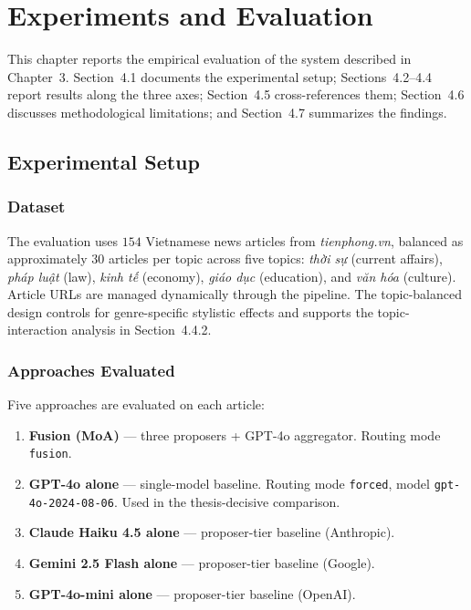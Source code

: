\chapter{Experiments and Evaluation}

This chapter reports the empirical evaluation of the system described in
Chapter~3. Section~4.1 documents the experimental setup; Sections~4.2--4.4
report results along the three axes; Section~4.5 cross-references them;
Section~4.6 discusses methodological limitations; and Section~4.7
summarizes the findings.

\section{Experimental Setup}

\subsection{Dataset}

The evaluation uses $154$ Vietnamese news articles from
\textit{tienphong.vn}, balanced as approximately $30$ articles per topic across five
topics: \textit{thời sự} (current affairs), \textit{pháp luật} (law),
\textit{kinh tế} (economy), \textit{giáo dục} (education), and
\textit{văn hóa} (culture). Article URLs are managed dynamically through the pipeline.
The topic-balanced design controls for genre-specific stylistic effects
and supports the topic-interaction analysis in Section~4.4.2.

\subsection{Approaches Evaluated}

Five approaches are evaluated on each article:

\begin{enumerate}
  \item \textbf{Fusion (MoA)} --- three proposers + GPT-4o aggregator.
        Routing mode \texttt{fusion}.
  \item \textbf{GPT-4o alone} --- single-model baseline. Routing mode
        \texttt{forced}, model \texttt{gpt-4o-2024-08-06}. Used in the
        thesis-decisive comparison.
  \item \textbf{Claude Haiku 4.5 alone} --- proposer-tier
        baseline (Anthropic).
  \item \textbf{Gemini 2.5 Flash alone} --- proposer-tier baseline (Google).
  \item \textbf{GPT-4o-mini alone} --- proposer-tier baseline (OpenAI).
\end{enumerate}

